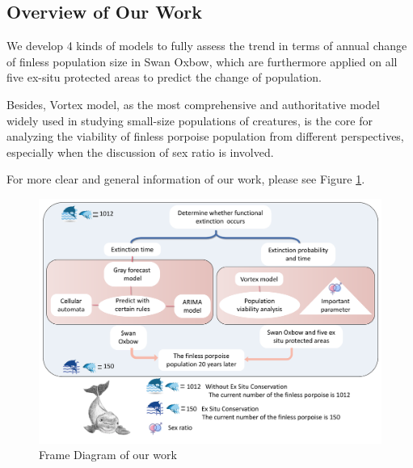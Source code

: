 \documentclass{mcmthesis}
\numberwithin{figure}{section}
\numberwithin{table}{section}
\numberwithin{equation}{section}
\begin{document}
\subsection{Overview of Our Work}
We develop 4 kinds of models to fully assess the trend in terms of 
annual change of finless population size in Swan Oxbow, which are 
furthermore applied on all five ex-situ protected areas to predict 
the change of population. 
\par
Besides, Vortex model, as the most comprehensive
and authoritative model widely used in studying small-size populations of
creatures, is the core for analyzing the viability of finless 
porpoise population from different perspectives, especially when 
the discussion of sex ratio is involved.
\par
For more clear and general information of our work, please see 
Figure \ref{Frame}.
\newpage
\begin{figure}[htbp]
  \centering
  \includegraphics[width =13cm]{codes/Framework.pdf}
  \caption{Frame Diagram of our work}\label{Frame}
\end{figure}
\end{document}
